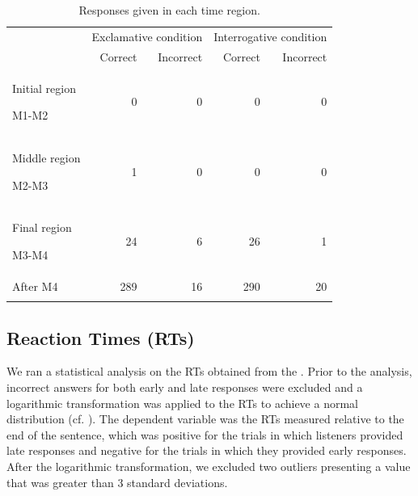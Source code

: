 \documentclass[output=paper]{langsci/langscibook}
\begin{document}
\begin{table}\small
\caption{Responses given in each time region.}
\label{tab:kel:1}

\begin{tabularx}{.9\textwidth}{X rrrr} 
\lsptoprule
& \multicolumn{2}{c}{{Exclamative condition}} & \multicolumn{2}{c}{{Interrogative condition}}\\
\cmidrule(lr){2-3}\cmidrule(lr){4-5} 
& {Correct } & {Incorrect } & {Correct } & {Incorrect }\\
\midrule
{Initial region}

M1-M2 & 0 & 0 & 0 & 0\\
\midrule
{Middle region}

M2-M3 & 1 & 0 & 0 & 0\\
\midrule
{Final region}

M3-M4 & 24 & 6 & 26 & 1\\
\midrule
After M4 & 289 & 16 & 290 & 20\\
\lspbottomrule
\end{tabularx}
\end{table}


   
\subsection{Reaction Times (RTs)}
\label{sec:kel:5.2}

We ran a statistical analysis on the RTs obtained from the . Prior to the analysis, incorrect answers for both early and late responses were excluded and a logarithmic transformation was applied to the RTs to achieve a normal distribution (cf. \citealt{baayen2008analyzing}). The dependent variable was the RTs measured relative to the end of the sentence, which was positive for the trials in which listeners provided late responses and negative for the trials in which they provided early responses. After the logarithmic transformation, we excluded two outliers presenting a value that was greater than 3 standard deviations. 
\end{document}
